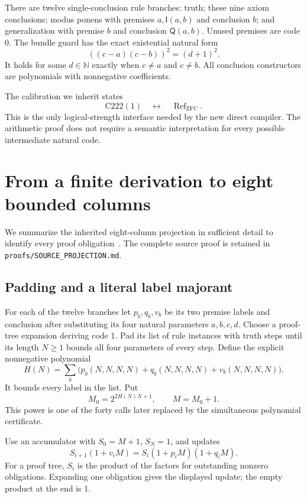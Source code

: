 \documentclass[11pt]{article}
\theoremstyle{definition}
\theoremstyle{remark}
\newcommand{\NN}{\mathbb N}
\newcommand{\Refut}{\operatorname{Ref}}
\newcommand{\File}[1]{\nolinkurl{#1}}
\newcommand{\I}{\mathsf I}
\newcommand{\Q}{\mathsf Q}
\begin{document}
There are twelve single-conclusion rule branches: truth; these nine
axiom conclusions; modus ponens with premises $a,\I(a,b)$ and conclusion
$b$; and generalization with premise $b$ and conclusion $\Q(a,b)$.
Unused premises are code 0. The bundle guard has the exact existential
natural form
\[
 ((c-a)(c-b))^2=(d+1)^2.
\]
It holds for some $d\in\NN$ exactly when $c\ne a$ and $c\ne b$.
All conclusion constructors are polynomials with nonnegative coefficients.

The calibration we inherit states
\begin{equation}\label{eq:calibration}
 \mathrm{C222}(1)\quad\longleftrightarrow\quad\Refut_{\mathrm{ZFC}}.
\end{equation}
This is the only logical-strength interface needed by the new direct
compiler. The arithmetic proof does not require a semantic interpretation
for every possible intermediate natural code.

\section{From a finite derivation to eight bounded columns}

We summarize the inherited eight-column projection in sufficient detail
to identify every proof obligation~\cite{projection}. The complete source
proof is retained in \File{proofs/SOURCE_PROJECTION.md}.

\subsection{Padding and a literal label majorant}
For each of the twelve branches let $p_b,q_b,v_b$ be its two premise
labels and conclusion after substituting its four natural parameters
$a,b,c,d$. Choose a proof-tree expansion deriving code 1. Pad its list of
rule instances with truth steps until its length $N\ge1$ bounds all four
parameters of every step. Define the explicit nonnegative polynomial
\[
 H(N)=\sum_b\bigl(p_b(N,N,N,N)+q_b(N,N,N,N)+v_b(N,N,N,N)\bigr).
\]
It bounds every label in the list. Put
\[
 M_0=2^{2H(N)N+1},\qquad M=M_0+1.
\]
This power is one of the forty calls later replaced by the simultaneous
polynomial certificate.

Use an accumulator with $S_0=M+1$, $S_N=1$, and updates
\begin{equation}\label{eq:accumulator}
 S_{i+1}(1+v_iM)=S_i(1+p_iM)(1+q_iM).
\end{equation}
For a proof tree, $S_i$ is the product of the factors for outstanding
nonzero obligations. Expanding one obligation gives the displayed update;
the empty product at the end is 1.
\end{document}
